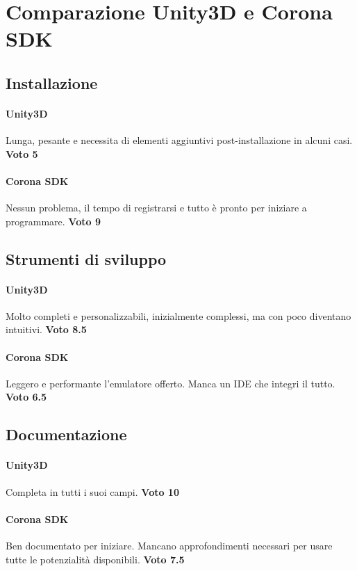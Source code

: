 
\newpage

\section{Comparazione Unity3D e Corona SDK}

	\subsection*{Installazione}
		\paragraph{Unity3D} Lunga, pesante e necessita di elementi aggiuntivi post-installazione in alcuni casi. \textbf{Voto 5}
		\paragraph{Corona SDK} Nessun problema, il tempo di registrarsi e tutto è pronto per iniziare a programmare. \textbf{Voto 9}
		
	\subsection*{Strumenti di sviluppo}
		\paragraph{Unity3D} Molto completi e personalizzabili, inizialmente complessi, ma con poco diventano intuitivi. \textbf{Voto 8.5}
		\paragraph{Corona SDK} Leggero e performante l'emulatore offerto. Manca un IDE che integri il tutto. \textbf{Voto 6.5}
	
	\subsection*{Documentazione}
		\paragraph{Unity3D} Completa in tutti i suoi campi. \textbf{Voto 10}
		
		\paragraph{Corona SDK} Ben documentato per iniziare. Mancano approfondimenti necessari per usare tutte le potenzialità disponibili. \textbf{Voto 7.5}
	
